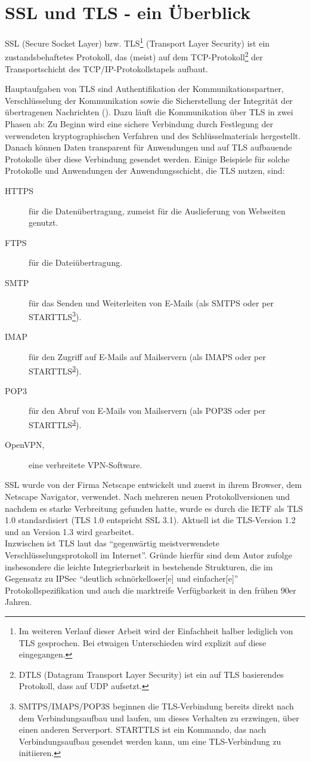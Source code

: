 \chapter{SSL und TLS - ein Überblick}

SSL (Secure Socket Layer) bzw. TLS\footnote{Im weiteren Verlauf dieser Arbeit wird der Einfachheit halber lediglich von TLS gesprochen. Bei etwaigen Unterschieden wird explizit auf diese eingegangen.} (Transport Layer Security) ist ein zustandsbehaftetes Protokoll, das (meist) auf dem TCP-Protokoll\footnote{DTLS (Datagram Transport Layer Security) ist ein auf TLS basierendes Protokoll, dass auf UDP aufsetzt.} der Transportschicht des TCP/IP-Protokollstapels aufbaut. 

Hauptaufgaben von TLS sind Authentifikation der Kommunikationspartner, Verschlüsselung der Kommunikation sowie die Sicherstellung der Integrität der übertragenen Nachrichten (\cite{meyer14}). Dazu läuft die Kommunikation über TLS in zwei Phasen ab: Zu Beginn wird eine sichere Verbindung durch Festlegung der verwendeten kryptographischen Verfahren und des Schlüsselmaterials hergestellt. Danach können Daten transparent für Anwendungen und auf TLS aufbauende Protokolle über diese Verbindung gesendet werden. Einige Beispiele für solche Protokolle und Anwendungen der Anwendungsschicht, die TLS nutzen, sind:
\begin{description}
\item[HTTPS] für die Datenübertragung, zumeist für die Auslieferung von Webseiten genutzt. 
\item[FTPS] für die Dateiübertragung.
\item[SMTP] für das Senden und Weiterleiten von E-Mails (als SMTPS oder per STARTTLS\footnote{\label{fn_starttls}SMTPS/IMAPS/POP3S beginnen die TLS-Verbindung bereits direkt nach dem Verbindungsaufbau und laufen, um dieses Verhalten zu erzwingen, über einen anderen Serverport. STARTTLS ist ein Kommando, das nach Verbindungsaufbau gesendet werden kann, um eine TLS-Verbindung zu initiieren.}).
\item[IMAP] für den Zugriff auf E-Mails auf Mailservern (als IMAPS oder per STARTTLS\textsuperscript{\ref{fn_starttls}}).
\item[POP3] für den Abruf von E-Mails von Mailservern (als POP3S oder per STARTTLS\textsuperscript{\ref{fn_starttls}}).
\item[OpenVPN,] eine verbreitete VPN-Software.
\end{description}

SSL wurde von der Firma Netscape entwickelt und zuerst in ihrem Browser, dem Netscape Navigator, verwendet. Nach mehreren neuen Protokollversionen und nachdem es starke Verbreitung gefunden hatte, wurde es durch die IETF als TLS 1.0 standardisiert (TLS 1.0 entspricht SSL 3.1). Aktuell ist die TLS-Version 1.2 und an Version 1.3 wird gearbeitet.\\
Inzwischen ist TLS laut \cite{schmeh09} das "`gegenwärtig meistverwendete Verschlüsselungsprotokoll im Internet"'. Gründe hierfür sind dem Autor zufolge insbesondere die leichte Integrierbarkeit in bestehende Strukturen, die im Gegensatz zu IPSec "`deutlich schnörkelloser[e] und einfacher[e]"' Protokollspezifikation und auch die marktreife Verfügbarkeit in den frühen 90er Jahren.

